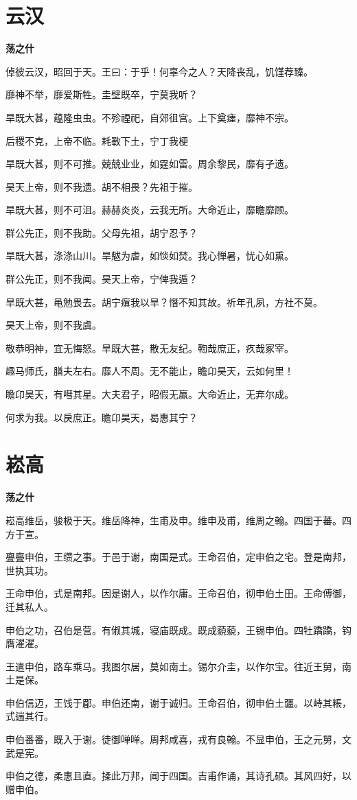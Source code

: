 \documentclass[12pt,a4paper]{ctexbook}
\begin{document}
\section{云汉}
\textbf{荡之什}\par\vspace{0.5em}
倬彼云汉，昭回于天。王曰：于乎！何辜今之人？天降丧乱，饥馑荐臻。\par
靡神不举，靡爱斯牲。圭壁既卒，宁莫我听？\par
旱既大甚，蕴隆虫虫。不殄禋祀，自郊徂宫。上下奠瘗，靡神不宗。\par
后稷不克，上帝不临。耗斁下土，宁丁我梗\par
旱既大甚，则不可推。兢兢业业，如霆如雷。周余黎民，靡有孑遗。\par
昊天上帝，则不我遗。胡不相畏？先祖于摧。\par
旱既大甚，则不可沮。赫赫炎炎，云我无所。大命近止，靡瞻靡顾。\par
群公先正，则不我助。父母先祖，胡宁忍予？\par
旱既大甚，涤涤山川。旱魃为虐，如惔如焚。我心惮暑，忧心如熏。\par
群公先正，则不我闻。昊天上帝，宁俾我遁？\par
旱既大甚，黾勉畏去。胡宁瘨我以旱？憯不知其故。祈年孔夙，方社不莫。\par
昊天上帝，则不我虞。\par
敬恭明神，宜无悔怒。旱既大甚，散无友纪。鞫哉庶正，疚哉冢宰。\par
趣马师氏，膳夫左右。靡人不周。无不能止，瞻卬昊天，云如何里！\par
瞻卬昊天，有嘒其星。大夫君子，昭假无赢。大命近止，无弃尔成。\par
何求为我。以戾庶正。瞻卬昊天，曷惠其宁？\par

\section{崧高}
\textbf{荡之什}\par\vspace{0.5em}
崧高维岳，骏极于天。维岳降神，生甫及申。维申及甫，维周之翰。四国于蕃。四方于宣。\par
亹亹申伯，王缵之事。于邑于谢，南国是式。王命召伯，定申伯之宅。登是南邦，世执其功。\par
王命申伯，式是南邦。因是谢人，以作尔庸。王命召伯，彻申伯土田。王命傅御，迁其私人。\par
申伯之功，召伯是营。有俶其城，寝庙既成。既成藐藐，王锡申伯。四牡蹻蹻，钩膺濯濯。\par
王遣申伯，路车乘马。我图尔居，莫如南土。锡尔介圭，以作尔宝。往近王舅，南土是保。\par
申伯信迈，王饯于郿。申伯还南，谢于诚归。王命召伯，彻申伯土疆。以峙其粻，式遄其行。\par
申伯番番，既入于谢。徒御啴啴。周邦咸喜，戎有良翰。不显申伯，王之元舅，文武是宪。\par
申伯之德，柔惠且直。揉此万邦，闻于四国。吉甫作诵，其诗孔硕。其风四好，以赠申伯。\par
\end{document}
